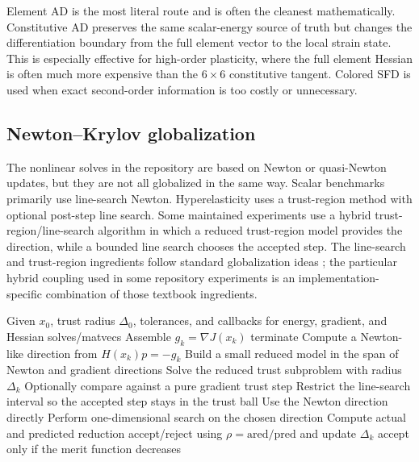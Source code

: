 Element AD is the most literal route and is often the cleanest mathematically.
Constitutive AD preserves the same scalar-energy source of truth but changes
the differentiation boundary from the full element vector to the local strain
state. This is especially effective for high-order plasticity, where the full
element Hessian is often much more expensive than the $6\times6$
constitutive tangent. Colored SFD is used when exact second-order information
is too costly or unnecessary.

\subsection{Newton--Krylov globalization}

The nonlinear solves in the repository are based on Newton or quasi-Newton
updates, but they are not all globalized in the same way. Scalar benchmarks
primarily use line-search Newton. Hyperelasticity uses a trust-region method
with optional post-step line search. Some maintained experiments use a hybrid
trust-region/line-search algorithm in which a reduced trust-region model
provides the direction, while a bounded line search chooses the accepted step.
The line-search and trust-region ingredients follow standard globalization ideas
\citep[Chs.~2--4]{nocedal2006numerical}; the particular hybrid coupling used in
some repository experiments is an implementation-specific combination of those
textbook ingredients.

\begin{algorithm}[H]
\caption{Hybrid trust-region / line-search Newton}
\begin{algorithmic}[1]
\State Given $x_0$, trust radius $\Delta_0$, tolerances, and callbacks for
energy, gradient, and Hessian solves/matvecs
  \State Assemble $g_k = \nabla J(x_k)$
    \State terminate
  \EndIf
  \State Compute a Newton-like direction from $H(x_k)p = -g_k$
    \State Build a small reduced model in the span of Newton and gradient directions
    \State Solve the reduced trust subproblem with radius $\Delta_k$
    \State Optionally compare against a pure gradient trust step
    \State Restrict the line-search interval so the accepted step stays in the trust ball
  \Else
    \State Use the Newton direction directly
  \EndIf
  \State Perform one-dimensional search on the chosen direction
  \State Compute actual and predicted reduction
    \State accept/reject using $\rho = \mathrm{ared}/\mathrm{pred}$ and update $\Delta_k$
  \Else
    \State accept only if the merit function decreases
  \EndIf
\EndFor
\end{algorithmic}
\end{algorithm}

